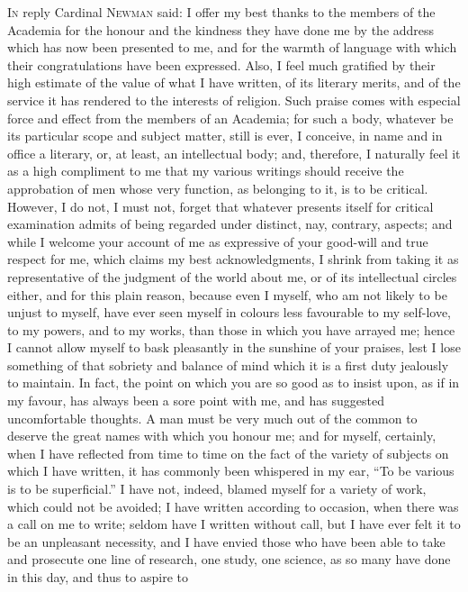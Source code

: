 I\textsc{n} reply Cardinal N\textsc{ewman}
said: I offer my best thanks to the members of the Academia for the
honour and the kindness they have done me by the address which has now
been presented to me, and for the warmth of language with which their
congratulations have been expressed. Also, I feel much gratified by
their high estimate of the value of what I have written, of its
literary merits, and of the service it has rendered to the interests
of religion. Such praise comes with especial force and effect from the
members of an Academia; for such a body, whatever be its particular
scope and subject matter, still is ever, I conceive, in name and in
office a literary, or, at least, an intellectual body; and, therefore,
I naturally feel it as a high compliment to me that my various
writings should receive the approbation of men whose very
function, as belonging to it, is to be critical. However, I do not, I
must not, forget that whatever presents itself for critical
examination admits of being regarded under distinct, nay, contrary,
aspects; and while I welcome your account of me as expressive of your
good-will and true respect for me, which claims my best
acknowledgments, I shrink from taking it as representative of the
judgment of the world about me, or of its intellectual circles either,
and for this plain reason, because even I myself, who am not likely to
be unjust to myself, have ever seen myself in colours less favourable
to my self-love, to my powers, and to my works, than those in which
you have arrayed me; hence I cannot allow myself to bask pleasantly in
the sunshine of your praises, lest I lose something of that sobriety
and balance of mind which it is a first duty jealously to maintain. In
fact, the point on which you are so good as to insist upon, as if in
my favour, has always been a sore point with me, and has suggested
uncomfortable thoughts. A man must be very much out of the common to
deserve the great names with which you honour me; and for myself,
certainly, when I have reflected from time to time on the fact of the
variety of subjects on which I have written, it has commonly been
whispered in my ear, ``To be various is to be superficial.'' I have not,
indeed, blamed myself for a variety of work, which could not be
avoided; I have written according to occasion, when there was a call
on me to write; seldom have I written without call, but I have ever
felt it to be an unpleasant necessity, and I have envied those who
have been able to take and prosecute one line of research, one study,
one science, as so many have done in this day, and thus to aspire to
